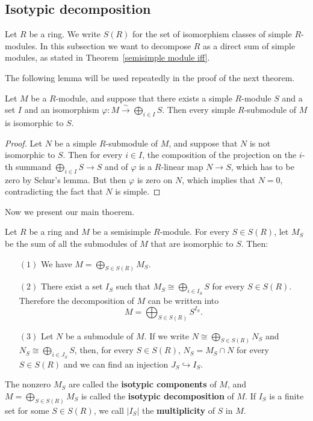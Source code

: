 \subsection{Isotypic decomposition}
Let $R$ be a ring. We write $S(R)$ for the set of isomorphism classes of simple $R$-modules. In this subsection we want to decompose $R$ as a direct sum of simple modules, as stated in Theorem~\ref{semisimple module iff}.\par
The following lemma will be used repeatedly in the proof of the next theorem.
\begin{lemma}\label{module sum of simple}
Let $M$ be a $R$-module, and suppose that there exists a simple $R$-module $S$ and a set $I$ and an isomorphism $\varphi:M\stackrel{\sim}{\to}\bigoplus_{i\in I}S$. Then every simple $R$-submodule of $M$ is isomorphic to $S$.
\end{lemma}
\begin{proof}
Let $N$ be a simple $R$-submodule of $M$, and suppose that $N$ is not isomorphic to $S$. Then for every $i\in I$, the composition of the projection on the $i$-th summand $\bigoplus_{i\in I}S\to S$ and of $\varphi$ is a $R$-linear map $N\to S$, which has to be zero by Schur's lemma. But then $\varphi$ is zero on $N$, which implies that $N=0$, contradicting the fact that $N$ is simple.
\end{proof}
Now we present our main thoerem.
\begin{theorem}\label{isotypic decomp}
Let $R$ be a ring and $M$ be a semisimple $R$-module. For every $S\in S(R)$, let $M_S$ be the sum of all the submodules of $M$ that are isomorphic to $S$. Then:
\begin{itemize}
\item[$(1)$] We have $M=\bigoplus_{S\in S(R)}M_S$.
\item[$(2)$] There exist a set $I_S$ such that $M_S\cong\bigoplus_{i\in I_S}S$ for every $S\in S(R)$. Therefore the decomposition of $M$ can be written into
\[M=\bigoplus_{S\in S(R)}S^{I_S}.\]
\item[$(3)$] Let $N$ be a submodule of $M$. If we write $N\cong\bigoplus_{S\in S(R)}N_S$ and $N_S\cong\bigoplus_{i\in J_S}S$, then, for every $S\in S(R)$, $N_S=M_S\cap N$ for every $S\in S(R)$ and we can find an injection $J_S\hookrightarrow I_S$.
\end{itemize}
\end{theorem}
The nonzero $M_S$ are called the \textbf{isotypic components} of $M$, and $M=\bigoplus_{S\in S(R)}M_S$ is called the \textbf{isotypic decomposition} of $M$. If $I_S$ is a finite set for some $S\in S(R)$, we call $|I_S|$ the \textbf{multiplicity} of $S$ in $M$.
